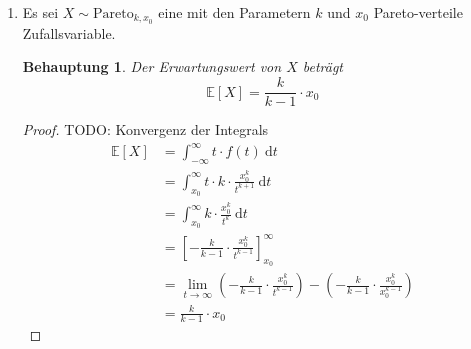 \documentclass[a4paper]{scrartcl}
\newtheorem*{behaupt}{Behauptung}
\newcommand{\dif}{\ \mathrm{d}}
\newcommand{\e}{\mathbb{E}}
\def \blattnr {11}
\begin{document}
\begin{enumerate}[label=\bfseries \blattnr.\arabic*]
\begin{enumerate}
            \item
                Es sei $X \sim \mathrm{Pareto}_{k,x_0}$ eine mit den Parametern
                $k$ und $x_0$ Pareto-verteile Zufallsvariable.
                \begin{behaupt}
                    Der Erwartungswert von $X$ beträgt
                    \begin{equation*}
                        \e[X] = \frac{k}{k-1} \cdot x_0
                    \end{equation*}
                \end{behaupt}
                \begin{proof}
                    TODO: Konvergenz der Integrals
                    \begin{equation*}
                        \begin{split}
                            \e[X]
                            &= \int_{-\infty}^\infty t \cdot f(t) \dif t \\
                            &= \int_{x_0}^\infty t \cdot k \cdot \frac{x_0^k}{t^{k+1}} \dif t \\
                            &= \int_{x_0}^\infty k \cdot \frac{x_0^k}{t^k} \dif t \\
                            &= \left[ -\frac{k}{k-1} \cdot \frac{x_0^k}{t^{k-1}} \right]_{x_0}^\infty \\
                            &= \lim_{t \to \infty} \left( -\frac{k}{k-1} \cdot \frac{x_0^k}{t^{k-1}} \right) - \left( -\frac{k}{k-1} \cdot \frac{x_0^k}{x_0^{k-1}} \right) \\
                            &= \frac{k}{k-1} \cdot x_0
                        \end{split}
                    \end{equation*}
                \end{proof}

        \end{enumerate}
\end{enumerate}
\end{document}
